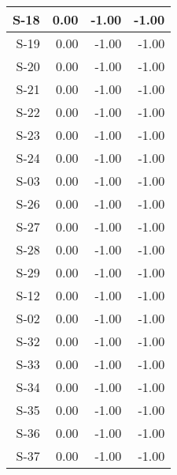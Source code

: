 \begin{tabular}{ | r | r | r | r | }
    \hline
                  S-18  &            0.00  &           -1.00  &           -1.00  \\
    \hline
                  S-19  &            0.00  &           -1.00  &           -1.00  \\
    \hline
                  S-20  &            0.00  &           -1.00  &           -1.00  \\
    \hline
                  S-21  &            0.00  &           -1.00  &           -1.00  \\
    \hline
                  S-22  &            0.00  &           -1.00  &           -1.00  \\
    \hline
                  S-23  &            0.00  &           -1.00  &           -1.00  \\
    \hline
                  S-24  &            0.00  &           -1.00  &           -1.00  \\
    \hline
                  S-03  &            0.00  &           -1.00  &           -1.00  \\
    \hline
                  S-26  &            0.00  &           -1.00  &           -1.00  \\
    \hline
                  S-27  &            0.00  &           -1.00  &           -1.00  \\
    \hline
                  S-28  &            0.00  &           -1.00  &           -1.00  \\
    \hline
                  S-29  &            0.00  &           -1.00  &           -1.00  \\
    \hline
                  S-12  &            0.00  &           -1.00  &           -1.00  \\
    \hline
                  S-02  &            0.00  &           -1.00  &           -1.00  \\
    \hline
                  S-32  &            0.00  &           -1.00  &           -1.00  \\
    \hline
                  S-33  &            0.00  &           -1.00  &           -1.00  \\
    \hline
                  S-34  &            0.00  &           -1.00  &           -1.00  \\
    \hline
                  S-35  &            0.00  &           -1.00  &           -1.00  \\
    \hline
                  S-36  &            0.00  &           -1.00  &           -1.00  \\
    \hline
                  S-37  &            0.00  &           -1.00  &           -1.00  \\

\end{tabular}
